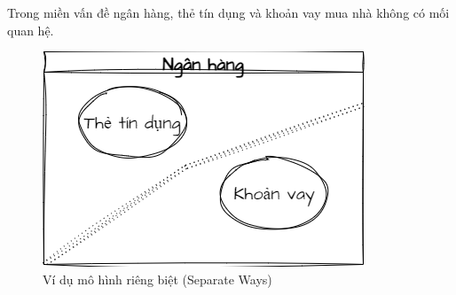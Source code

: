 

\begin{example} Trong miền vấn đề ngân hàng,     thẻ tín dụng và khoản vay mua nhà không có mối quan hệ. 
    
    \begin{figure}[H]
        
        \centering
        
        \includegraphics[scale = 0.5]{pictures/mo_hinh_rieng_biet_separate_ways/main.drawio.png}
        
        \caption{Ví dụ  mô hình riêng biệt (Separate Ways)  }
        
    \end{figure}
\end{example} 

